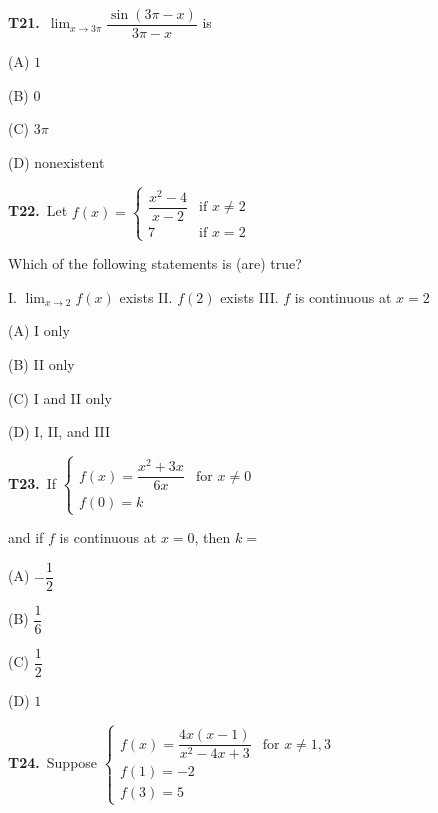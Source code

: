 \documentclass[11pt]{article}
\begin{document}
\bigskip\noindent\textbf{T21.}\ $\displaystyle\lim_{x\to 3\pi}\dfrac{\sin(3\pi-x)}{3\pi-x}$ is
\begin{list}{}{\setlength{\leftmargin}{3em}\setlength{\labelwidth}{2.5em}\setlength{\itemsep}{0pt}\setlength{\topsep}{2pt}}
\item[(A)] $1$
\item[(B)] $0$
\item[(C)] $3\pi$
\item[(D)] nonexistent
\end{list}

\bigskip\noindent\textbf{T22.}\ Let $f(x) = \begin{cases} \dfrac{x^2-4}{x-2} & \text{if } x \neq 2 \\ 7 & \text{if } x = 2 \end{cases}$

Which of the following statements is (are) true?

I. $\displaystyle\lim_{x\to 2} f(x)$ exists
II. $f(2)$ exists
III. $f$ is continuous at $x = 2$
\begin{list}{}{\setlength{\leftmargin}{3em}\setlength{\labelwidth}{2.5em}\setlength{\itemsep}{0pt}\setlength{\topsep}{2pt}}
\item[(A)] I only
\item[(B)] II only
\item[(C)] I and II only
\item[(D)] I, II, and III
\end{list}

\bigskip\noindent\textbf{T23.}\ If $\begin{cases} f(x) = \dfrac{x^2+3x}{6x} & \text{for } x \neq 0 \\ f(0) = k \end{cases}$

and if $f$ is continuous at $x = 0$, then $k =$
\begin{list}{}{\setlength{\leftmargin}{3em}\setlength{\labelwidth}{2.5em}\setlength{\itemsep}{0pt}\setlength{\topsep}{2pt}}
\item[(A)] $-\dfrac{1}{2}$
\item[(B)] $\dfrac{1}{6}$
\item[(C)] $\dfrac{1}{2}$
\item[(D)] $1$
\end{list}

\bigskip\noindent\textbf{T24.}\ Suppose $\begin{cases} f(x) = \dfrac{4x(x-1)}{x^2-4x+3} & \text{for } x \neq 1, 3 \\ f(1) = -2 \\ f(3) = 5 \end{cases}$
\end{document}
